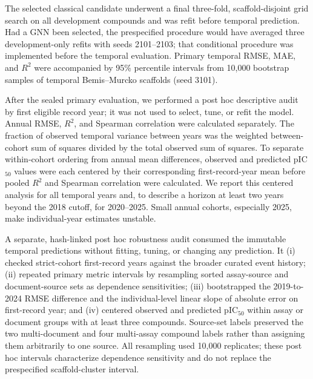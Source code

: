 \documentclass[11pt]{article}
\begin{document}
The selected classical candidate underwent a final three-fold, scaffold-disjoint
grid search on all development compounds and was refit before temporal prediction.
Had a GNN been selected, the prespecified procedure would have averaged three
development-only refits with seeds 2101--2103; that conditional procedure was
implemented before the temporal evaluation. Primary temporal RMSE, MAE, and
$R^2$ were accompanied by 95\% percentile intervals from 10,000 bootstrap samples
of temporal Bemis--Murcko scaffolds (seed 3101).

After the sealed primary evaluation, we performed a post hoc descriptive audit
by first eligible record year; it was not used to select, tune, or refit the
model. Annual RMSE, $R^2$, and Spearman correlation were calculated separately.
The fraction of observed temporal variance between years was the weighted
between-cohort sum of squares divided by the total observed sum of squares. To
separate within-cohort ordering from annual mean differences, observed and
predicted pIC$_{50}$ values were each centered by their corresponding
first-record-year mean before pooled $R^2$ and Spearman correlation were
calculated. We report this centered analysis for all temporal years and, to
describe a horizon at least two years beyond the 2018 cutoff, for 2020--2025.
Small annual
cohorts, especially 2025, make individual-year estimates unstable.

A separate, hash-linked post hoc robustness audit consumed the immutable temporal
predictions without fitting, tuning, or changing any prediction. It (i) checked
strict-cohort first-record years against the broader curated event history;
(ii) repeated primary metric intervals by resampling sorted assay-source and
document-source sets as dependence sensitivities; (iii) bootstrapped the
2019-to-2024 RMSE difference and the individual-level linear slope of absolute
error on first-record year; and (iv) centered observed and predicted pIC$_{50}$
within assay or document groups with at least three compounds. Source-set labels
preserved the two multi-document and four multi-assay compound labels rather than
assigning them arbitrarily to one source. All resampling used 10,000 replicates;
these post hoc intervals characterize dependence sensitivity and do not replace
the prespecified scaffold-cluster interval.
\end{document}
